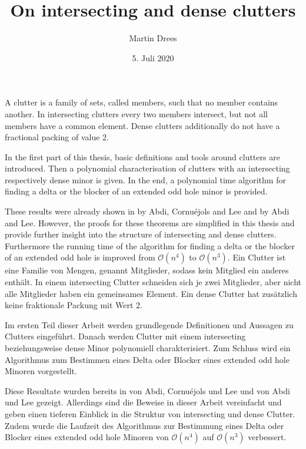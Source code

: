 \documentclass[a4paper, 12pt, twoside=false]{scrbook}
\author{Martin Drees}
\date{5. Juli 2020}
\title{On intersecting and dense clutters}
\theoremstyle{definition}
\begin{document}
\maketitle
{}
A clutter is a family of sets, called members, such that no member contains another.
In intersecting clutters every two members intersect, but not all members have a common element. Dense clutters additionally do not have a fractional packing of value 2.

In the first part of this thesis, basic definitions and tools around clutters are introduced.
Then a polynomial characterisation of clutters with an intersecting respectively dense minor is given.
In the end, a polynomial time algorithm for finding a delta or the blocker of an extended odd hole minor is provided.

These results were already shown in  by Abdi, Cornuéjols and Lee and  by Abdi and Lee.
However, the proofs for these theorems are simplified in this thesis and provide further insight into the structure of intersecting and dense clutters.
Furthermore the running time of the algorithm for finding a delta or the blocker of an extended odd hole is improved from $\mathcal{O}(n^4)$ to $\mathcal{O}(n^3)$.
{\let\cleardoublepage\relax {}}
Ein Clutter ist eine Familie von Mengen, genannt Mitglieder, sodass kein Mitglied ein anderes enthält. In einem intersecting Clutter schneiden sich je zwei Mitglieder, aber nicht alle Mitglieder haben ein gemeinsames Element.
Ein dense Clutter hat zusätzlich keine fraktionale Packung mit Wert 2.

Im ersten Teil dieser Arbeit werden grundlegende Definitionen und Aussagen zu Clutters eingeführt. Danach werden Clutter mit einem intersecting beziehungsweise dense Minor polynomiell charakterisiert. Zum Schluss wird ein Algorithmus zum Bestimmen eines Delta oder Blocker eines extended odd hole Minoren vorgestellt.

Diese Resultate wurden bereits in  von Abdi, Cornuéjols und Lee und  von Abdi und Lee gezeigt. Allerdings sind die Beweise in dieser Arbeit vereinfacht und geben einen tieferen Einblick in die Struktur von intersecting und dense Clutter. Zudem wurde die Laufzeit des Algorithmus zur Bestimmung eines Delta oder Blocker eines extended odd hole Minoren von $\mathcal{O}(n^4)$ auf $\mathcal{O}(n^3)$ verbessert.
\end{document}

